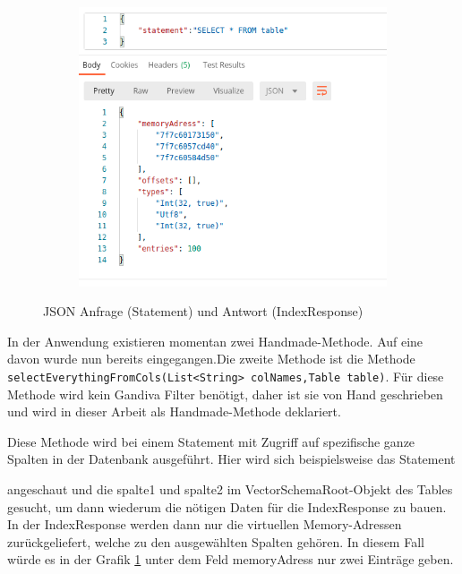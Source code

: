 \begin{figure}[h]
  \centering
  \begin{subfigure}[b]{0.5\textwidth}
    \includegraphics[width=1.0\linewidth]{img/json}
  \end{subfigure}
  \caption{JSON Anfrage (Statement) und Antwort (IndexResponse)}
  \label{graf_4}
\end{figure}

In der Anwendung existieren momentan zwei Handmade-Methode. Auf eine davon wurde nun bereits eingegangen.Die zweite Methode ist die Methode \texttt{selectEverythingFromCols(List<String> colNames,Table table)}. Für diese Methode wird kein Gandiva Filter benötigt, daher ist sie von Hand geschrieben und wird in dieser Arbeit als Handmade-Methode deklariert.

Diese Methode wird bei einem Statement mit Zugriff auf spezifische ganze Spalten in der Datenbank ausgeführt. Hier wird sich beispielsweise das Statement   

\begin{center}
\end{center}

angeschaut und die spalte1 und spalte2 im VectorSchemaRoot-Objekt des Tables gesucht, um dann wiederum die nötigen Daten für die IndexResponse zu bauen.
In der IndexResponse werden dann nur die virtuellen Memory-Adressen zurückgeliefert, welche zu den ausgewählten Spalten gehören.
In diesem Fall würde es in der Grafik \ref{graf_4} unter dem Feld memoryAdress nur zwei Einträge geben.

